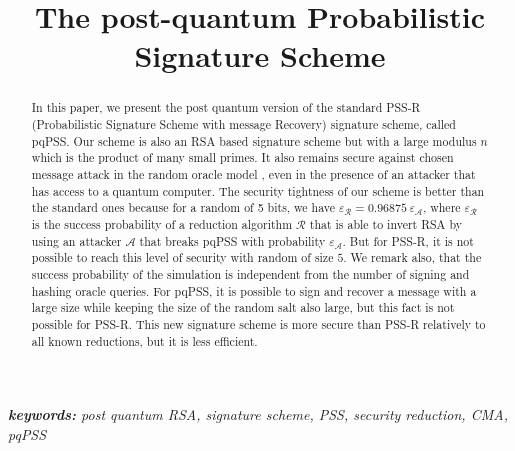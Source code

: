\documentclass[a4paper,11pt]{article}
\begin{document}
\title{The post-quantum Probabilistic Signature Scheme}
\maketitle
\begin{abstract}
In this paper, we present the post quantum version of the standard PSS-R (Probabilistic Signature Scheme with message Recovery) signature scheme, called pqPSS. Our scheme is also an RSA based signature scheme but with a large modulus $n$ which is the product of many small primes. It also remains secure against chosen message attack in the random oracle model , even in the presence of an attacker that has access to a quantum computer. The security tightness of our scheme is better than the standard ones because for a random of 5 bits, we have $\varepsilon_{\mathcal{R}}=0.96875 \ \varepsilon_{\mathcal{A}}$, where $\varepsilon_{\mathcal{R}}$  is the success probability of a reduction algorithm $\mathcal{R}$ that is able to invert RSA by using an attacker $\mathcal{A}$ that breaks pqPSS with probability $\varepsilon_{\mathcal{A}}$. But for PSS-R, it is not possible to reach this level of security with random of size $5$. We remark also, that the success probability of the simulation is independent from the number of signing and hashing oracle queries. For pqPSS, it is possible to sign and recover a message with a large size while keeping the size of the random salt also large, but this fact is not possible for PSS-R. This new signature scheme is more secure than PSS-R relatively to all known reductions, but it is less efficient.
\end{abstract}
{\it \textbf{keywords:} post quantum RSA, signature scheme, PSS, security reduction, CMA, pqPSS}
\end{document}
